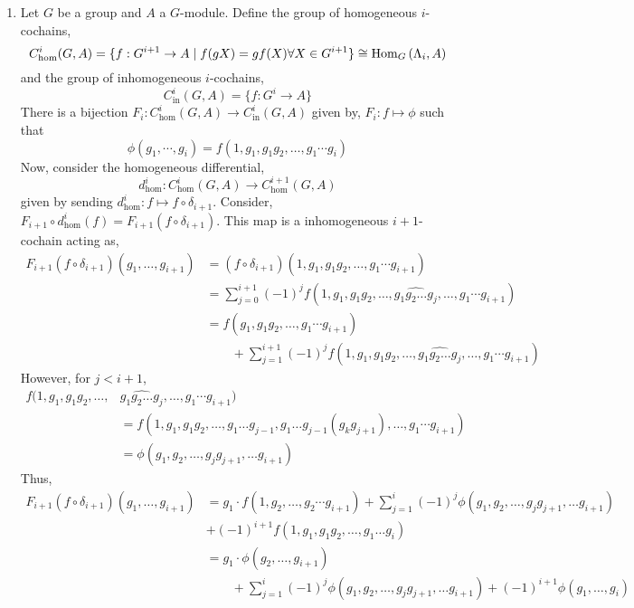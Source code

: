 \documentclass[12pt]{extarticle}
\begin{document}
\begin{enumerate}
\item Let $G$ be a group and $A$ a $G$-module. Define the group of homogeneous $i$-cochains,
\newcommand{\homcochain}[1]{C_{\mathrm{hom}}^{#1}(G,A)}
\[\homcochain{i} = \{ f : G^{i+1} \to A \mid f(gX) = g f(X) \forall X \in G^{i+1} \} \cong \Homover{G}{\Lambda_i}{A} \]
and the group of inhomogeneous $i$-cochains,
\newcommand{\inhomcochain}[1]{C_{\mathrm{in}}^{#1}(G,A)}
\[\inhomcochain{i} = \{ f : G^{i} \to A  \} \]
There is a bijection $F_i : \homcochain{i} \to \inhomcochain{i}$ given by, $F_i : f \mapsto \phi$ such that
\[ \phi(g_1, \cdots, g_i) = f(1, g_1, g_1 g_2, \dots, g_1 \cdots g_i) \]
Now, consider the homogeneous differential,
\[d^i_{\mathrm{hom}} : \homcochain{i} \to \homcochain{i+1}\]
given by sending $d^i_{\mathrm{hom}} : f \mapsto f \circ \delta_{i+1}$. Consider, $F_{i+1} \circ d^i_{\mathrm{hom}}(f) = F_{i+1}(f \circ \delta_{i+1})$. This map is a inhomogeneous $i+1$-cochain acting as,
\begin{align*}
F_{i+1}(f \circ \delta_{i+1})(g_1, \dots, g_{i+1}) & = (f \circ \delta_{i+1})(1, g_1, g_1 g_2, \dots, g_1 \cdots g_{i+1}) 
\\
& = \sum_{j = 0}^{i+1} (-1)^j f(1, g_1, g_1 g_2, \dots, \widehat{g_1 g_2 \dots g_j}, \dots, g_1 \cdots g_{i+1}) 
\\
& = f(g_1, g_1 g_2, \dots, g_1 \cdots g_{i+1}) 
\\
& \quad \quad + \sum_{j = 1}^{i+1} (-1)^j f(1, g_1, g_1 g_2, \dots, \widehat{g_1 g_2 \dots g_j}, \dots, g_1 \cdots g_{i+1}) 
\end{align*}
However, for $j < i+1$,
\begin{align*} 
f(1, g_1, g_1 g_2, \dots, & \widehat{g_1 g_2 \dots g_j}, \dots, g_1 \cdots g_{i+1})
\\
& = f(1, g_1, g_1 g_2, \dots, g_1 \dots g_{j-1}, g_1 \dots g_{j-1} (g_k g_{j+1}), \dots, g_1 \cdots g_{i+1}) 
\\
& = \phi(g_1, g_2, \dots, g_j g_{j+1}, \dots g_{i+1})
\end{align*}
Thus,
\begin{align*}
F_{i+1}(f \circ \delta_{i+1})(g_1, \dots, g_{i+1}) 
& = g_1 \cdot f(1, g_2, \dots, g_2 \cdots g_{i+1}) + \sum_{j = 1}^{i} (-1)^j \phi(g_1, g_2, \dots, g_j g_{j+1}, \dots g_{i+1})
\\
& + (-1)^{i+1} f(1, g_1, g_1 g_2, \dots, g_1 \dots g_{i})
\\
& = g_1 \cdot \phi(g_2, \dots, g_{i+1}) 
\\ & \quad \quad + \sum_{j = 1}^{i} (-1)^j \phi(g_1, g_2, \dots, g_j g_{j+1}, \dots g_{i+1}) + (-1)^{i+1} \phi(g_1, \dots, g_i)

\end{align*}
\end{enumerate}
\end{document}
